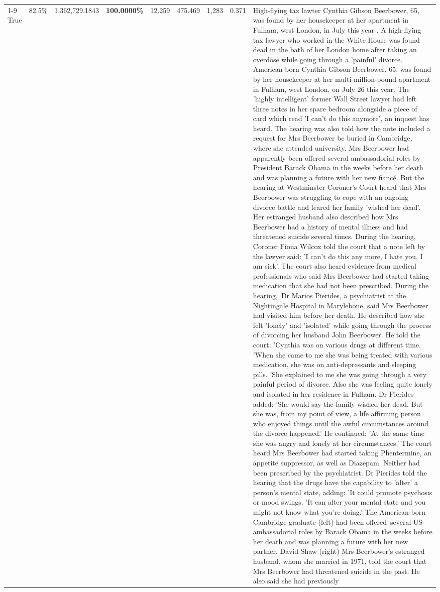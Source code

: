 \begin{table}[H]
\begin{tabular}{lllrlllll}
\cline{1-9}
True & 82.5\% & 1,362,729.1843 & \bfseries \color{red} 100.0000\% & 12.259 & 475.469 & 1,283 & 0.371 & High-flying tax lawter Cynthia Gibson Beerbower, 65, was found by her housekeeper at her apartment in Fulham, west London, in July this year . A high-flying tax lawyer who worked in the White House was found dead in the bath of her London home after taking an overdose while going through a 'painful' divorce. American-born Cynthia Gibson Beerbower, 65, was found by her housekeeper at her multi-million-pound apartment in Fulham, west London, on July 26 this year. The 'highly intelligent' former Wall Street lawyer had left three notes in her spare bedroom alongside a piece of card which read 'I can't do this anymore', an inquest has heard. The hearing was also told how the note included a request for Mrs Beerbower be buried in Cambridge, where she attended university. Mrs Beerbower had apparently been offered several ambassadorial roles by President Barack Obama in the weeks before her death and was planning a future with her new fiancé. But the hearing at Westminster Coroner's Court heard that Mrs Beerbower was struggling to cope with an ongoing divorce battle and feared her family 'wished her dead'. Her estranged husband also described how Mrs Beerbower had a history of mental illness and had threatened suicide several times. During the hearing, Coroner Fiona Wilcox told the court that a note left by the lawyer said: 'I can't do this any more, I hate you, I am sick'. The court also heard evidence from medical professionals who said Mrs Beerbower had started taking medication that she had not been prescribed. During the hearing, Dr Marios Pierides, a psychiatrist at the Nightingale Hospital in Marylebone, said Mrs Beerbower had visited him before her death. He described how she felt 'lonely' and 'isolated' while going through the process of divorcing her husband John Beerbower. He told the court: 'Cynthia was on various drugs at different time. 'When she came to me she was being treated with various medication, she was on anti-depressants and sleeping pills. 'She explained to me she was going through a very painful period of divorce. Also she was feeling quite lonely and isolated in her residence in Fulham. Dr Pierides added: 'She would say the family wished her dead. But she was, from my point of view, a life affirming person who enjoyed things until the awful circumstances around the divorce happened.' He continued: 'At the same time she was angry and lonely at her circumstances.' The court heard Mrs Beerbower had started taking Phentermine, an appetite suppressor, as well as Diazepam. Neither had been prescribed by the psychiatrist. Dr Pierides told the hearing that the drugs have the capability to 'alter' a person's mental state, adding: 'It could promote psychosis or mood swings. 'It can alter your mental state and you might not know what you're doing.' The American-born Cambridge graduate (left) had been offered several US ambassadorial roles by Barack Obama in the weeks before her death and was planning a future with her new partner, David Shaw (right) Mrs Beerbower's estranged husband, whom she married in 1971, told the court that Mrs Beerbower had threatened suicide in the past. He also said she had previously 
\end{tabular}
\end{table}
